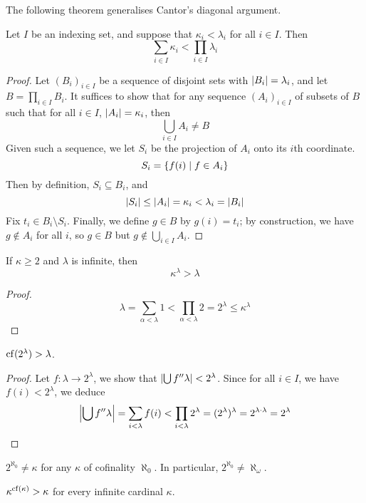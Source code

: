 The following theorem generalises Cantor's diagonal argument.
\begin{theorem}
    Let \( I \) be an indexing set, and suppose that \( \kappa_i < \lambda_i \) for all \( i \in I \).
    Then
    \[ \sum_{i \in I} \kappa_i < \prod_{i \in I} \lambda_i \]
\end{theorem}
\begin{proof}
    Let \( (B_i)_{i \in I} \) be a sequence of disjoint sets with \( \abs{B_i} = \lambda_i \), and let \( B = \prod_{i \in I} B_i \).
    It suffices to show that for any sequence \( (A_i)_{i \in I} \) of subsets of \( B \) such that for all \( i \in I \), \( \abs{A_i} = \kappa_i \), then
    \[ \bigcup_{i \in I} A_i \neq B \]
    Given such a sequence, we let \( S_i \) be the projection of \( A_i \) onto its \( i \)th coordinate.
    \[ S_i = \qty{f(i) \mid f \in A_i} \]
    Then by definition, \( S_i \subseteq B_i \), and
    \[ \abs{S_i} \leq \abs{A_i} = \kappa_i < \lambda_i = \abs{B_i} \]
    Fix \( t_i \in B_i \setminus S_i \).
    Finally, we define \( g \in B \) by \( g(i) = t_i \); by construction, we have \( g \notin A_i \) for all \( i \), so \( g \in B \) but \( g \notin \bigcup_{i \in I} A_i \).
\end{proof}
\begin{corollary}
    If \( \kappa \geq 2 \) and \( \lambda \) is infinite, then
    \[ \kappa^\lambda > \lambda \]
\end{corollary}
\begin{proof}
    \[ \lambda = \sum_{\alpha < \lambda} 1 < \prod_{\alpha < \lambda} 2 = 2^\lambda \leq \kappa^\lambda \]
\end{proof}
\begin{corollary}
    \( \operatorname{cf}(2^\lambda) > \lambda \).
\end{corollary}
\begin{proof}
    Let \( f : \lambda \to 2^\lambda \), we show that \( \abs{\bigcup f '' \lambda} < 2^\lambda \).
    Since for all \( i \in I \), we have \( f(i) < 2^\lambda \), we deduce
    \[ \abs{\bigcup f '' \lambda} = \sum_{i < \lambda} f(i) < \prod_{i < \lambda} 2^\lambda = (2^\lambda)^\lambda = 2^{\lambda \cdot \lambda} = 2^\lambda \]
\end{proof}
\begin{corollary}
    \( 2^{\aleph_0} \neq \kappa \) for any \( \kappa \) of cofinality \( \aleph_0 \).
    In particular, \( 2^{\aleph_0} \neq \aleph_\omega \).
\end{corollary}
\begin{corollary}
    \( \kappa^{\operatorname{cf}(\kappa)} > \kappa \) for every infinite cardinal \( \kappa \).
\end{corollary}
